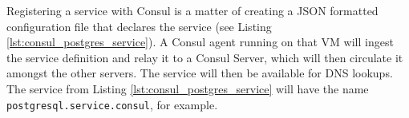 Registering a service with Consul is a matter of creating a JSON formatted configuration file that declares the service (see Listing \ref{lst:consul_postgres_service}). A Consul agent running on that VM will ingest the service definition and relay it to a Consul Server, which will then circulate it amongst the other servers. The service will then be available for DNS lookups. The service from Listing \ref{lst:consul_postgres_service} will have the name \texttt{postgresql.service.consul}, for example.